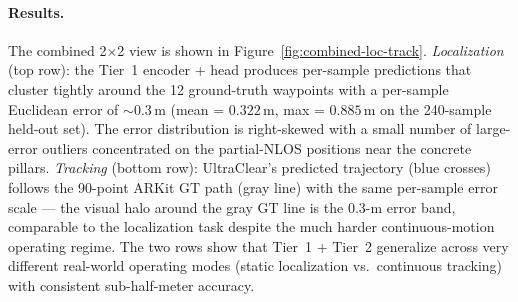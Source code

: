 \paragraph{Results.}
The combined 2$\times$2 view is shown in
Figure~\ref{fig:combined-loc-track}. \emph{Localization}
(top row): the Tier~1 encoder + head produces per-sample
predictions that cluster tightly around the 12
ground-truth waypoints with a per-sample Euclidean error of
$\sim$$0.3$\,m (mean = $0.322$\,m, max = $0.885$\,m on the
240-sample held-out set). The error distribution is
right-skewed with a small number of large-error outliers
concentrated on the partial-NLOS positions near the
concrete pillars. \emph{Tracking} (bottom row): UltraClear's
predicted trajectory (blue crosses) follows the 90-point
ARKit GT path (gray line) with the same per-sample error
scale --- the visual halo around the gray GT line is the
0.3-m error band, comparable to the localization task
despite the much harder continuous-motion operating regime.
The two rows show that Tier~1 + Tier~2 generalize across
very different real-world operating modes (static
localization vs.\ continuous tracking) with consistent
sub-half-meter accuracy.
